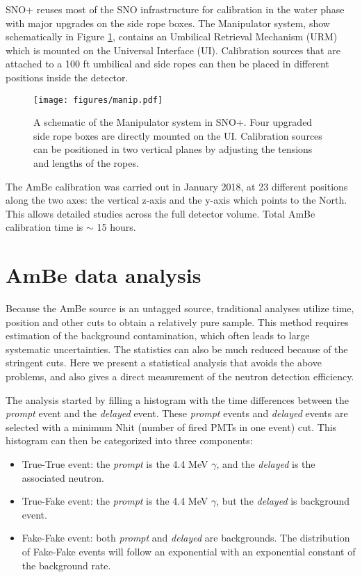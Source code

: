 \documentclass[a4paper]{jpconf}
\begin{document}
SNO+ reuses most of the SNO infrastructure for calibration\cite{Moffat:2005tq} in the water phase with major upgrades on the side rope boxes. The Manipulator system, show schematically in Figure \ref{fig:1}, contains an Umbilical Retrieval Mechanism (URM) which is mounted on the Universal Interface (UI). Calibration sources that are attached to a 100 ft umbilical and side ropes can then be placed in different positions inside the detector. 

\begin{figure}[h]
\texttt{[image: figures/manip.pdf]}\hspace{2pc}%
\begin{minipage}[b]{18pc}\caption{\label{fig:1}A schematic of the Manipulator system in SNO+. Four upgraded side rope boxes are directly mounted on the UI. Calibration sources can be positioned in two vertical planes by adjusting the tensions and lengths of the ropes.}
\end{minipage}
\end{figure}

The AmBe calibration was carried out in January 2018, at 23 different positions along the two axes: the vertical z-axis and the y-axis which points to the North. This allows detailed studies across the full detector volume. Total AmBe calibration time is $\sim$ 15 hours.

\section{AmBe data analysis}

Because the AmBe source is an untagged source, traditional analyses utilize time, position and other cuts to obtain a relatively pure sample. This method requires estimation of the background contamination, which often leads to large systematic uncertainties. The statistics can also be much reduced because of the stringent cuts. Here we present a statistical analysis that avoids the above problems, and also gives a direct measurement of the neutron detection efficiency.

The analysis started by filling a histogram with the time differences between the \textit{prompt} event and the \textit{delayed} event. These \textit{prompt} events and \textit{delayed} events are selected with a minimum Nhit (number of fired PMTs in one event) cut. This histogram can then be categorized into three components:

\begin{itemize}
\item True-True event: the \textit{prompt} is the 4.4 MeV $\gamma$, and the \textit{delayed} is the associated neutron. 
\item True-Fake event: the \textit{prompt} is the 4.4 MeV $\gamma$, but the \textit{delayed} is background event.
\item Fake-Fake event: both \textit{prompt} and \textit{delayed} are backgrounds. The distribution of Fake-Fake events will follow an exponential with an exponential constant of the background rate.
\end{itemize}
\end{document}
